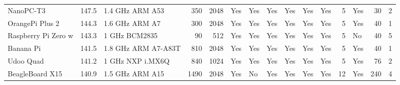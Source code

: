 \begin{table}
\begin{tabular}{lrlrrllllllrlrr}
    \rowcolor[rgb]{ .851,  .851,  .851} NanoPC-T3 & \cellcolor[rgb]{ .82,  .871,  .51}147.5 & 1.4 GHz ARM A53 & 350   & 2048  & \cellcolor[rgb]{ .573,  .816,  .314}Yes & \cellcolor[rgb]{ .573,  .816,  .314}Yes & \cellcolor[rgb]{ .573,  .816,  .314}Yes & \cellcolor[rgb]{ .573,  .816,  .314}Yes & \cellcolor[rgb]{ .573,  .816,  .314}Yes & \cellcolor[rgb]{ .573,  .816,  .314}Yes & 5     & \cellcolor[rgb]{ .573,  .816,  .314}Yes & 30    & 2 \\
    OrangePi Plus 2 & \cellcolor[rgb]{ .914,  .898,  .514}144.3 & 1.6 GHz ARM A7 & 300   & 2048  & \cellcolor[rgb]{ .573,  .816,  .314}Yes & \cellcolor[rgb]{ .573,  .816,  .314}Yes & \cellcolor[rgb]{ .573,  .816,  .314}Yes & \cellcolor[rgb]{ .573,  .816,  .314}Yes & \cellcolor[rgb]{ .573,  .816,  .314}Yes & \cellcolor[rgb]{ .573,  .816,  .314}Yes & 5     & \cellcolor[rgb]{ .573,  .816,  .314}Yes & 40    & 1 \\
    \rowcolor[rgb]{ .851,  .851,  .851} Raspberry Pi Zero w & \cellcolor[rgb]{ .941,  .906,  .518}143.3 & 1 GHz BCM2835 & 90    & 512   & \cellcolor[rgb]{ .573,  .816,  .314}Yes & \cellcolor[rgb]{ .573,  .816,  .314}Yes & \cellcolor[rgb]{ .573,  .816,  .314}Yes & \cellcolor[rgb]{ .573,  .816,  .314}Yes & \cellcolor[rgb]{ .573,  .816,  .314}Yes & \cellcolor[rgb]{ .573,  .816,  .314}Yes & 5     & No    & 40    & 5 \\
    Banana Pi & \cellcolor[rgb]{ .996,  .922,  .518}141.5 & 1.8 GHz ARM A7-A83T & 810   & 2048  & \cellcolor[rgb]{ .573,  .816,  .314}Yes & \cellcolor[rgb]{ .573,  .816,  .314}Yes & \cellcolor[rgb]{ .573,  .816,  .314}Yes & \cellcolor[rgb]{ .573,  .816,  .314}Yes & \cellcolor[rgb]{ .573,  .816,  .314}Yes & \cellcolor[rgb]{ .573,  .816,  .314}Yes & 5     & \cellcolor[rgb]{ .573,  .816,  .314}Yes & 40    & 1 \\
    \rowcolor[rgb]{ .851,  .851,  .851} Udoo Quad & \cellcolor[rgb]{ .996,  .918,  .514}141.2 & 1 GHz NXP i.MX6Q & 840   & 1024  & \cellcolor[rgb]{ .573,  .816,  .314}Yes & \cellcolor[rgb]{ .573,  .816,  .314}Yes & \cellcolor[rgb]{ .573,  .816,  .314}Yes & \cellcolor[rgb]{ .573,  .816,  .314}Yes & \cellcolor[rgb]{ .573,  .816,  .314}Yes & \cellcolor[rgb]{ .573,  .816,  .314}Yes & 5     & \cellcolor[rgb]{ .573,  .816,  .314}Yes & 76    & 2 \\
    BeagleBoard X15 & \cellcolor[rgb]{ .996,  .914,  .514}140.9 & 1.5 GHz ARM A15 & 1490  & 2048  & \cellcolor[rgb]{ .573,  .816,  .314}Yes & No    & \cellcolor[rgb]{ .573,  .816,  .314}Yes & \cellcolor[rgb]{ .573,  .816,  .314}Yes & \cellcolor[rgb]{ .573,  .816,  .314}Yes & \cellcolor[rgb]{ .573,  .816,  .314}Yes & 12    & \cellcolor[rgb]{ .573,  .816,  .314}Yes & 240   & 4 \\

\end{tabular}
\end{table}
